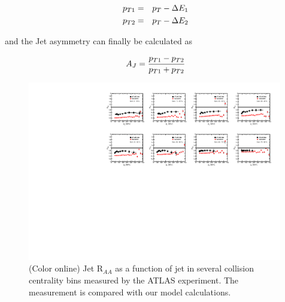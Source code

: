 \documentclass[reprint,amsmath,amssymb,aps,showpacs,showkeys]{revtex4}
\begin{document}
 \begin{eqnarray}
   p_{T1} &= & p_{T} - \Delta E_1 \nonumber \\
   p_{T2} &= & p_{T} - \Delta E_2 \nonumber   
 \end{eqnarray}

 and the Jet asymmetry can finally be calculated as

\begin{equation}
  A_{J} = \frac{p_{T1}-p_{T2}}{p_{T1}+p_{T2}} \\
\end{equation}
 



\begin{figure}
  \includegraphics[width=0.99\textwidth]{Figures/Fig_RAA_Jet_Centrality_276TeV.pdf}
  \caption{(Color online) Jet R$_{AA}$ as  a function of jet \pt in several collision centrality bins
    measured by the ATLAS experiment. The measurement is compared with our model calculations.}
  \label{Fig:JetRAAPt_ATLAS_276TeV}
\end{figure}
\end{document}
